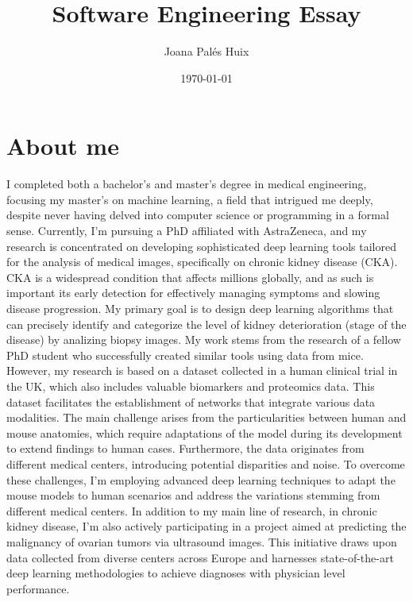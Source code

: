 \documentclass[11pt]{article}
\title{Software Engineering Essay}
\author{Joana Palés Huix}
\date{\today}
\begin{document}
\maketitle

\section{About me}

I completed both a bachelor's and master's degree in medical engineering, focusing my master's on machine learning, a field that intrigued me deeply, despite never having delved into computer science or programming in a formal sense.
Currently, I'm pursuing a PhD affiliated with AstraZeneca, and my research is concentrated on developing sophisticated deep learning tools tailored for the analysis of medical images, specifically on chronic kidney disease (CKA). CKA is a widespread condition that affects millions globally, and as such is important its early detection for effectively managing symptoms and slowing disease progression. My primary goal is to design deep learning algorithms that can precisely identify and categorize the level of kidney deterioration (stage of the disease) by analizing biopsy images.
My work stems from the research of a fellow PhD student who successfully created similar tools using data from mice. However, my research is based on a dataset collected in a human clinical trial in the UK, which also includes valuable biomarkers and proteomics data. This dataset facilitates the establishment of networks that integrate various data modalities. The main challenge arises from the particularities between human and mouse anatomies, which require adaptations of the model during its development to extend findings to human cases. Furthermore, the data originates from different medical centers, introducing potential disparities and noise.
To overcome these challenges, I'm employing advanced deep learning techniques to adapt the mouse models to human scenarios and address the variations stemming from different medical centers.
In addition to my main line of research, in chronic kidney disease, I'm also actively participating in a project aimed at predicting the malignancy of ovarian tumors via ultrasound images. This initiative draws upon data collected from diverse centers across Europe and harnesses state-of-the-art deep learning methodologies to achieve diagnoses with physician level performance.
\end{document}
